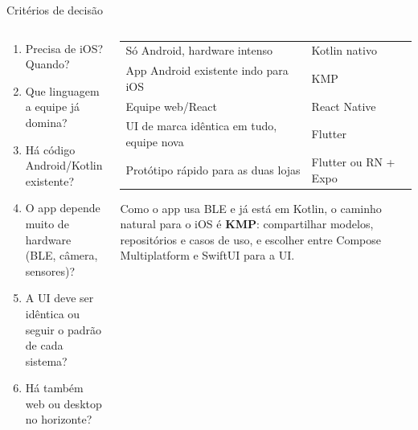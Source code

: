 \documentclass[aspectratio=169,10pt]{beamer}
\begin{document}
\begin{frame}{Critérios de decisão}
  \begin{columns}[T]
    \begin{column}{0.5\textwidth}
      \begin{conceito}
        \begin{enumerate}
          \item Precisa de iOS? Quando?
          \item Que linguagem a equipe já domina?
          \item Há código Android/Kotlin existente?
          \item O app depende muito de hardware (BLE, câmera, sensores)?
          \item A UI deve ser idêntica ou seguir o padrão de cada sistema?
          \item Há também web ou desktop no horizonte?
        \end{enumerate}
      \end{conceito}
    \end{column}
    \begin{column}{0.48\textwidth}
      \scriptsize
      \begin{tabularx}{\linewidth}{@{}L l@{}}
        \toprule
         &  \\
        \midrule
        Só Android, hardware intenso & Kotlin nativo \\
        App Android existente indo para iOS & KMP \\
        Equipe web/React & React Native \\
        UI de marca idêntica em tudo, equipe nova & Flutter \\
        Protótipo rápido para as duas lojas & Flutter ou RN + Expo \\
        \bottomrule
      \end{tabularx}
      \begin{dica}
        Como o app usa BLE e já está em Kotlin, o caminho natural para o iOS é \textbf{KMP}: compartilhar modelos, repositórios e casos de uso, e escolher entre Compose Multiplatform e SwiftUI para a UI.
      \end{dica}
    \end{column}
  \end{columns}
\end{frame}

\end{document}
